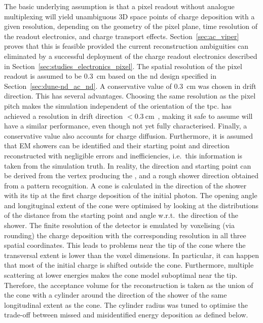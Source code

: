 The basic underlying assumption is that a pixel readout without analogue multiplexing will yield unambiguous 3D space points of charge deposition with a given resolution, depending on the geometry of the pixel plane, time resolution of the readout electronics, and charge transport effects.
Section~\ref{sec:ac_viper} proves that this is feasible provided the current reconstruction ambiguities can eliminated by a successful deployment of the \larpix{} charge readout electronics described in Section~\ref{sec:studies_electronics_pixel}.
The spatial resolution of the pixel readout is assumed to be \SI{0.3}{\centi\metre} based on the \gls{nd} design specified in Section~\ref{sec:dune-nd_ac_nd}.
A conservative value of \SI{0.3}{\centi\meter} was chosen in drift direction.
This has several advantages.
Choosing the same resolution as the pixel pitch makes the simulation independent of the orientation of the \gls{tpc}.
\uboone{} has achieved a resolution in drift direction $< \SI{0.3}{\centi\metre}$~\cite{uboone}, making it safe to assume \larpix{} will have a similar performance, even though not yet fully characterised.
Finally, a conservative value also accounts for charge diffusion.
Furthermore, it is assumed that EM showers can be identified and their starting point and direction reconstructed with negligible errors and inefficiencies, i.e.\ this information is taken from the simulation truth.
In reality, the direction and starting point can be derived from the vertex producing the \Pgpz, and a rough shower direction obtained from a pattern recognition.
A cone is calculated in the direction of the shower with its tip at the first charge deposition of the initial photon.
The opening angle and longituginal extent of the cone were optimised by looking at the distributions of the distance from the starting point and angle w.r.t.\ the direction of the shower.
The finite resolution of the detector is emulated by voxelising (via rounding) the charge deposition with the corresponding resolution in all three spatial coordinates.
This leads to problems near the tip of the cone where the transversal extent is lower than the voxel dimensions.
In particular, it can happen that most of the initial charge is shifted outside the cone.
Furthermore, multiple scattering at lower energies makes the cone model suboptimal near the tip.
Therefore, the acceptance volume for the reconstruction is taken as the union of the cone with a cylinder around the direction of the shower of the same longitudinal extent as the cone.
The cylinder radius was tuned to optimise the trade-off between missed and misidentified energy deposition as defined below.

